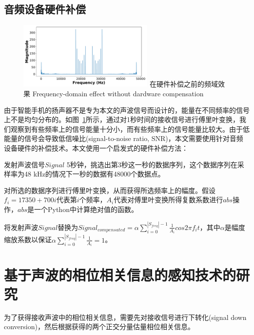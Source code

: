 \subsection{音频设备硬件补偿}

\begin{figure}[!htp]
  \centering
  \includegraphics[width=0.6\textwidth]{figure/nocompensation.pdf}
  \bicaption
    {在硬件补偿之前的频域效果}
    {Frequency-domain effect without dardware compensation}
  \label{fig:nocompensation}
\end{figure}

由于智能手机的扬声器不是专为本文的声波信号而设计的，能量在不同频率的信号上不是均匀分布的。如图~\ref{fig:nocompensation}所示，通过对1秒时间的接收信号进行傅里叶变换，我们观察到有些频率上的信号能量十分小，而有些频率上的信号能量比较大。由于低能量的信号会导致低信噪比(signal-to-noise ratio, SNR)，本文需要使用针对音频设备硬件的补偿技术。本文使用一个启发式的硬件补偿方法：
\begin{enumerate*}[label=(\arabic*)]
    \item 发射声波信号$Signal$ 5秒钟，挑选出第3秒这一秒的数据序列，这个数据序列在采样率为48 kHz的情况下一秒的数据有48000个数据点。
    \item 对所选的数据序列进行傅里叶变换，从而获得所选频率上的幅度。假设$f_{i} = 17350 + 700i$代表第$i$个频率，$A_{i}$代表对傅里叶变换所得复数系数进行$abs$操作，$abs$是一个Python中计算绝对值的函数。
    \item 将发射声波$Signal$替换为$Signal_{compensated}=\alpha \sum_{i=0}^{|S_{freq}|-1} \frac{1}{A_i} cos 2\pi f_{i}t$，其中$\alpha$是幅度缩放系数以保证$\alpha \sum_{i=0}^{|S_{freq}|-1}\frac{1}{A_i}=1$。
\end{enumerate*}



\section{基于声波的相位相关信息的感知技术的研究}\label{sec:sensing-research}
为了获得接收声波中的相位相关信息，需要先对接收信号进行下转化(signal down conversion)，然后根据获得的两个正交分量估量相位相关信息。

